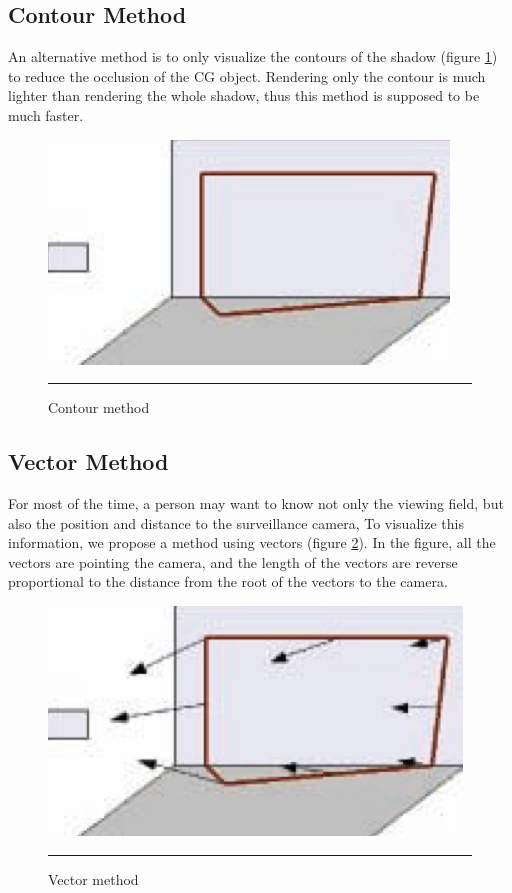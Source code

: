 \subsection{Contour Method}

An alternative method is to only visualize the contours of the shadow (figure \ref{fig:ContourMethod}) to reduce the occlusion of the CG object. Rendering only the contour is much lighter than rendering the whole shadow, thus this method is supposed to be much faster.

\begin{figure}[htbp]
	\centering
	\includegraphics{./Primitives/theory_contour.png}
	\rule{35em}{0.5pt}
	\caption[Contour method]{Contour method}
	\label{fig:ContourMethod}
\end{figure}

\subsection{Vector Method}

For most of the time, a person may want to know not only the viewing field, but also the position and distance to the surveillance camera, To visualize this information, we propose a method using vectors (figure \ref{fig:VectorMethod}). In the figure, all the vectors are pointing the camera, and the length of the vectors are reverse proportional to the distance from the root of the vectors to the camera.

\begin{figure}[htbp]
	\centering
	\includegraphics{./Primitives/theory_vector.png}
	\rule{35em}{0.5pt}
	\caption[Vector method]{Vector method}
	\label{fig:VectorMethod}
\end{figure}

